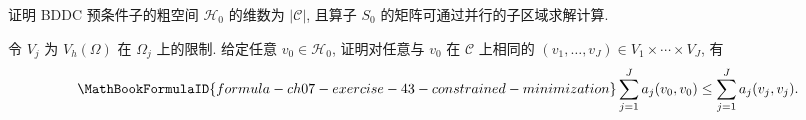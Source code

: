 \begin{MBExercise}
\label{exr:ch07-42}
证明 BDDC 预条件子的粗空间 $\mathcal H_0$ 的维数为 $|\mathcal C|$, 且算子 $S_0$ 的矩阵可通过并行的子区域求解计算.
\end{MBExercise}

\begin{MBExercise}
\label{exr:ch07-43}
令 $V_j$ 为 $V_h(\Omega)$ 在 $\Omega_j$ 上的限制. 给定任意 $v_0\in\mathcal H_0$, 证明对任意与 $v_0$ 在 $\mathcal C$ 上相同的 $(v_1,\ldots,v_J)\in V_1\times\cdots\times V_J$, 有
\[
\MathBookFormulaID{formula-ch07-exercise-43-constrained-minimization}
\sum_{j=1}^{J}a_j(v_0,v_0)
\leq\sum_{j=1}^{J}a_j(v_j,v_j).
\]
\end{MBExercise}
